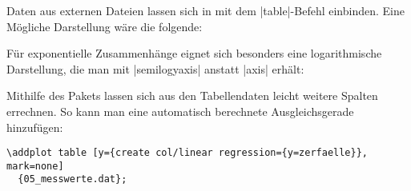 % 

Daten aus externen Dateien lassen sich in  mit dem |table|-Befehl einbinden. Eine Mögliche Darstellung wäre die folgende:

\begin{LTXexample}[pos=b,rframe={},preset=\centering]
\end{LTXexample}

Für exponentielle Zusammenhänge eignet sich besonders eine logarithmische Darstellung, die man mit |semilogyaxis| anstatt |axis| erhält:

\begin{center}
\end{center}

Mithilfe des Pakets  lassen sich aus den Tabellendaten leicht weitere Spalten errechnen. So kann man eine automatisch berechnete Ausgleichsgerade hinzufügen:

\begin{lstlisting}
\addplot table [y={create col/linear regression={y=zerfaelle}}, mark=none]
  {05_messwerte.dat};
\end{lstlisting}
